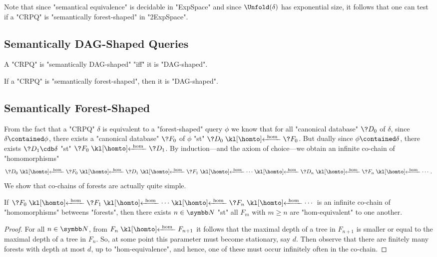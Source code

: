 Note that since "semantical equivalence" is decidable in "ExpSpace" and
since $\Unfold(\delta)$ has exponential size, it follows that one can test if
a "CRPQ" is "semantically forest-shaped" in "2ExpSpace".

\subsection{Semantically DAG-Shaped Queries}

\begin{fact}
	A "CRPQ" is "semantically DAG-shaped" "iff" it is "DAG-shaped".
\end{fact}

\begin{corollary}
	\AP\label{coro:sem-forest-implies-DAG}
	If a "CRPQ" is "semantically forest-shaped", then it is "DAG-shaped".
\end{corollary}

\subsection{Semantically Forest-Shaped}

From the fact that a "CRPQ" $\delta$ is equivalent to a "forest-shaped" query $\phi$
we know that for all "canonical database" $\?D_0$ of $\delta$, since $\delta \contained \phi$,
there exists a "canonical database" $\?F_0$ of $\phi$ "st" $\?D_0 \cohomto \?F_0$.
But dually since $\phi \contained \delta$, there exists $\?D_1 \cdb \delta$ "st" $\?F_0 \cohomto \?D_1$.
By induction---and the axiom of choice---we obtain an infinite co-chain of "homomorphisms"
\[
	\?D_0 \cohomto \?F_0 \cohomto \?D_1 \cohomto \?F_1 \cohomto \cdots \cohomto \?D_n \cohomto \?F_n \cohomto \cdots.
\]
We show that co-chains of forests are actually quite simple.

\begin{fact}
	If $\?F_0 \cohomto \?F_1 \cohomto \cdots \cohomto \?F_n \cohomto \cdots$
	is an infinite co-chain of "homomorphisms" betweens "forests", 
	then there exists $n \in \N$ "st" all $F_m$ with $m\geq n$
	are "hom-equivalent" to one another.
\end{fact}

\begin{proof}
	For all $n \in \N$, from $F_n \cohomto F_{n+1}$ it follows that
	the maximal depth of a tree in $F_{n+1}$ is smaller or equal to the
	maximal depth of a tree in $F_{n}$. So, at some point this parameter
	must become stationary, say $d$. Then observe that there
	are finitely many forests with depth at most $d$, up to "hom-equivalence",
	and hence, one of these must occur infinitely often in the co-chain.
\end{proof}


